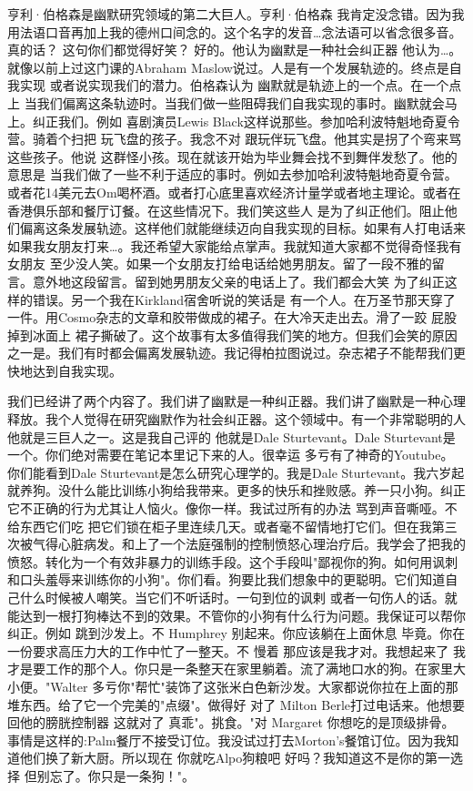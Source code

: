 亨利·伯格森是幽默研究领域的第二大巨人。亨利·伯格森 我肯定没念错。因为我用法语口音再加上我的德州口间念的。这个名字的发音…念法语可以省念很多音。真的话？ 这句你们都觉得好笑？ 好的。他认为幽默是一种社会纠正器 他认为…。就像以前上过这门课的Abraham Maslow说过。人是有一个发展轨迹的。终点是自我实现 或者说实现我们的潜力。伯格森认为 幽默就是轨迹上的一个点。在一个点上 当我们偏离这条轨迹时。当我们做一些阻碍我们自我实现的事时。幽默就会马上。纠正我们。例如 喜剧演员Lewis Black这样说那些。参加哈利波特魁地奇夏令营。骑着个扫把 玩飞盘的孩子。我念不对 跟玩伴玩飞盘。他其实是拐了个弯来骂这些孩子。他说 这群怪小孩。现在就该开始为毕业舞会找不到舞伴发愁了。他的意思是 当我们做了一些不利于适应的事时。例如去参加哈利波特魁地奇夏令营。或者花14美元去Om喝杯酒。或者打心底里喜欢经济计量学或者地主理论。或者在香港俱乐部和餐厅订餐。在这些情况下。我们笑这些人 是为了纠正他们。阻止他们偏离这条发展轨迹。这样他们就能继续迈向自我实现的目标。如果有人打电话来 如果我女朋友打来…。我还希望大家能给点掌声。我就知道大家都不觉得奇怪我有女朋友 至少没人笑。如果一个女朋友打给电话给她男朋友。留了一段不雅的留言。意外地这段留言。留到她男朋友父亲的电话上了。我们都会大笑 为了纠正这样的错误。另一个我在Kirkland宿舍听说的笑话是 有一个人。在万圣节那天穿了一件。用Cosmo杂志的文章和胶带做成的裙子。在大冷天走出去。滑了一跤 屁股掉到冰面上 裙子撕破了。这个故事有太多值得我们笑的地方。但我们会笑的原因之一是。我们有时都会偏离发展轨迹。我记得柏拉图说过。杂志裙子不能帮我们更快地达到自我实现。 

我们已经讲了两个内容了。我们讲了幽默是一种纠正器。我们讲了幽默是一种心理释放。我个人觉得在研究幽默作为社会纠正器。这个领域中。有一个非常聪明的人 他就是三巨人之一。这是我自己评的 他就是Dale Sturtevant。Dale Sturtevant是一个。你们绝对需要在笔记本里记下来的人。很幸运 多亏有了神奇的Youtube。你们能看到Dale Sturtevant是怎么研究心理学的。我是Dale Sturtevant。我六岁起就养狗。没什么能比训练小狗给我带来。更多的快乐和挫败感。养一只小狗。纠正它不正确的行为尤其让人恼火。像你一样。我试过所有的办法 骂到声音嘶哑。不给东西它们吃 把它们锁在柜子里连续几天。或者毫不留情地打它们。但在我第三次被气得心脏病发。和上了一个法庭强制的控制愤怒心理治疗后。我学会了把我的愤怒。转化为一个有效非暴力的训练手段。这个手段叫"鄙视你的狗。如何用讽刺和口头羞辱来训练你的小狗"。你们看。狗要比我们想象中的更聪明。它们知道自己什么时候被人嘲笑。当它们不听话时。一句到位的讽剌 或者一句伤人的话。就能达到一根打狗棒达不到的效果。不管你的小狗有什么行为问题。我保证可以帮你纠正。例如 跳到沙发上。不 Humphrey 别起来。你应该躺在上面休息 毕竟。你在一份要求高压力大的工作中忙了一整天。不 慢着 那应该是我才对。我想起来了 我才是要工作的那个人。你只是一条整天在家里躺着。流了满地口水的狗。在家里大小便。"Walter 多亏你"帮忙"装饰了这张米白色新沙发。大家都说你拉在上面的那堆东西。给了它一个完美的"点缀"。做得好 对了 Milton Berle打过电话来。他想要回他的膀胱控制器 这就对了 真乖"。挑食。"对 Margaret 你想吃的是顶级排骨。事情是这样的:Palm餐厅不接受订位。我没试过打去Morton's餐馆订位。因为我知道他们换了新大厨。所以现在 你就吃Alpo狗粮吧 好吗？我知道这不是你的第一选择 但别忘了。你只是一条狗！"。 

